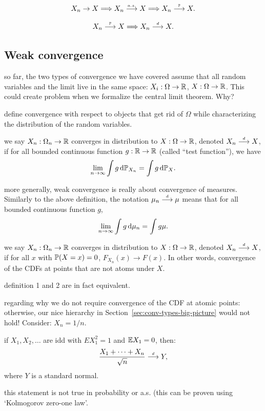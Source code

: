 \documentclass{article}
\begin{document}
\[ X_n \to X \Longrightarrow X_n \ascv X \Longrightarrow X_n \pcv X. \]

\[ X_n \pcv X \Longrightarrow X_n \dcv X. \]


\subsection{Weak convergence}

 so far, the two types of convergence we have covered assume that all random variables and the limit live in the same space: $X_i : \Omega \to \R$, $X : \Omega \to \R$. This could create problem when we formalize the central limit theorem. Why?

 define convergence with respect to objects that get rid of $\Omega$ while characterizing the distribution of the random variables.

 we say $X_n : \Omega_n \to \R$ converges in distribution to $X : \Omega \to \R$, denoted $X_n \dcv X$, if for all bounded continuous function $g : \R \to \R$ (called ``test function''), we have 
\[ \lim_{n\to\infty} \int g \ud \P_{X_n} = \int g \ud \P_X. \]

 more generally, weak convergence is really about convergence of measures. Similarly to the above definition, the notation $\mu_n \dcv \mu$ means that for all bounded continuous function $g$, \[ \lim_{n\to\infty} \int g \ud \mu_n = \int g \mu. \]

 we say $X_n : \Omega_n \to \R$ converges in distribution to $X : \Omega \to \R$, denoted $X_n \dcv X$, if for all $x$ with $\P(X=x) = 0$, $F_{X_n}(x) \to F(x)$. In other words, convergence of the CDFs at points that are not atoms under $X$.

 definition 1 and 2 are in fact equivalent.

 regarding why we do not require convergence of the CDF at atomic points: otherwise, our nice hierarchy in Section~\ref{sec:conv-types-big-picture} would not hold! Consider: $X_n = 1/n$.

 if $X_1, X_2, \dots$ are idd with $E X_1^2 = 1$ and $\E X_1 = 0$, then:
\[ \frac{X_1 + \dots + X_n}{\sqrt{n}} \dcv Y, \]
where $Y$ is a standard normal. 

 this statement is not true in probability or a.s. (this can be proven using `Kolmogorov zero-one law'.
\end{document}
